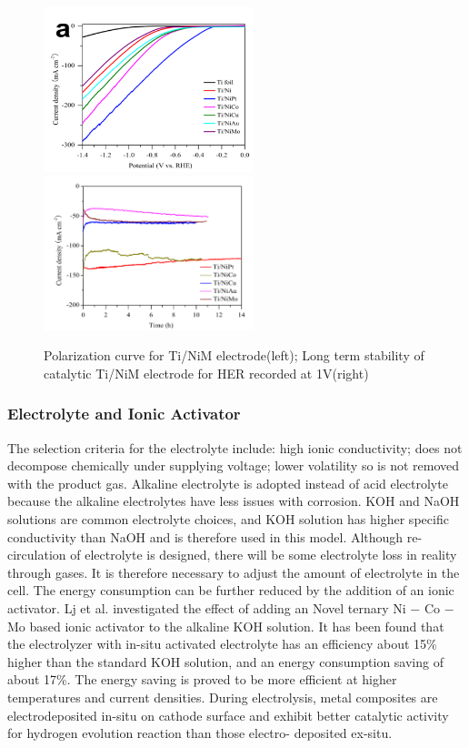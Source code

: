 \documentclass[11pt, a4paper]{article}
\begin{document}
\begin{figure}[H] 
\centering
\includegraphics[width=6.1cm]{polarization.png}
\includegraphics[width=6.1cm]{stability.png}
\caption{Polarization curve for Ti/NiM electrode(left); Long term stability of catalytic Ti/NiM electrode for HER recorded at 1V(right)
\label{fig:cat}
\cite{cathode}}
\end{figure}


\subsubsection{Electrolyte and Ionic Activator}
The selection criteria for the electrolyte include: high ionic conductivity;  does not decompose chemically under supplying voltage; lower volatility so is not removed with the product gas. Alkaline electrolyte is adopted instead of acid electrolyte because the alkaline electrolytes have less issues with corrosion. KOH and NaOH solutions are common electrolyte choices, and KOH solution has higher specific conductivity than NaOH and is therefore used in this model. Although re-circulation of electrolyte is designed, there will be some electrolyte loss in reality through gases. It is therefore necessary to adjust the amount of electrolyte in the cell. 
The energy consumption can be further reduced by the addition of an ionic activator. Lj et al. \cite{ionic} investigated the effect of adding an Novel ternary Ni $-$ Co $-$ Mo based ionic activator to the alkaline KOH solution. It has been found that the electrolyzer with in-situ activated electrolyte has an efficiency about 15\% higher than the standard KOH solution, and an energy consumption saving of about 17\%. The energy saving is proved to be more efficient at higher temperatures and current densities. During electrolysis, metal composites are electrodeposited in-situ on cathode surface and exhibit better catalytic activity for hydrogen evolution reaction than those electro- deposited ex-situ. 
\end{document}
